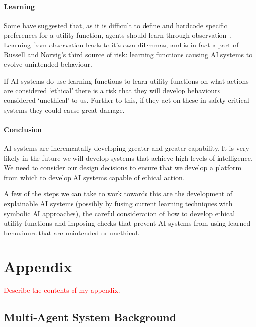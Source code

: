 \documentclass[]{final_report}
\begin{document}
\subsubsection{Learning}
Some have suggested that, as it is difficult to define and hardcode specific preferences for a utility function, agents should learn through observation~\cite{armstrong2015motivated, abel2016reinforcement}. Learning from observation leads to it's own dilemmas, and is in fact a part of Russell and Norvig's third source of risk: learning functions causing AI systems to evolve unintended behaviour.\par 
If AI systems do use learning functions to learn utility functions on what actions are considered `ethical' there is a risk that they will develop behaviours considered `unethical' to us. Further to this, if they act on these in safety critical systems they could cause great damage.

\subsubsection{Conclusion}
AI systems are incrementally developing greater and greater capability. It is very likely in the future we will develop systems that achieve high levels of intelligence. We need to consider our design decisions to ensure that we develop a platform from which to develop AI systems capable of ethical action.\par 
A few of the steps we can take to work towards this are the development of explainable AI systems (possibly by fusing current learning techniques with symbolic AI approaches), the careful consideration of how to develop ethical utility functions and imposing checks that prevent AI systems from using learned behaviours that are unintended or unethical.

\chapter{Appendix}
\label{appendix}
\textcolor{red}{Describe the contents of my appendix.}
\section{Multi-Agent System Background}
\end{document}
